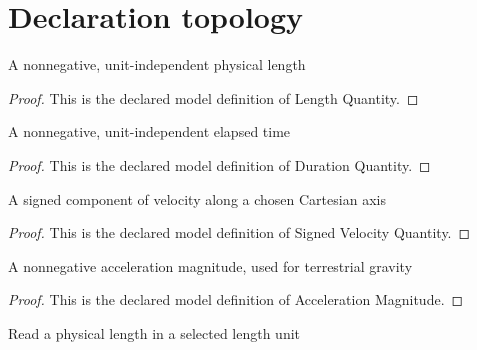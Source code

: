 \section{Declaration topology}
\begin{definition}
  \label{def:physics:phyx-mini-0753:phyxminiproblems-problemphyxmini0753-lengthquantity}
  A nonnegative, unit-independent physical length
\end{definition}
\begin{proof}
  This is the declared model definition of Length Quantity.
\end{proof}
\begin{definition}
  \label{def:physics:phyx-mini-0753:phyxminiproblems-problemphyxmini0753-durationquantity}
  A nonnegative, unit-independent elapsed time
\end{definition}
\begin{proof}
  This is the declared model definition of Duration Quantity.
\end{proof}
\begin{definition}
  \label{def:physics:phyx-mini-0753:phyxminiproblems-problemphyxmini0753-signedvelocityquantity}
  A signed component of velocity along a chosen Cartesian axis
\end{definition}
\begin{proof}
  This is the declared model definition of Signed Velocity Quantity.
\end{proof}
\begin{definition}
  \label{def:physics:phyx-mini-0753:phyxminiproblems-problemphyxmini0753-accelerationmagnitude}
  A nonnegative acceleration magnitude, used for terrestrial gravity
\end{definition}
\begin{proof}
  This is the declared model definition of Acceleration Magnitude.
\end{proof}
\begin{definition}
  \label{def:physics:phyx-mini-0753:phyxminiproblems-problemphyxmini0753-lengthreadout}
  Read a physical length in a selected length unit
\end{definition}
